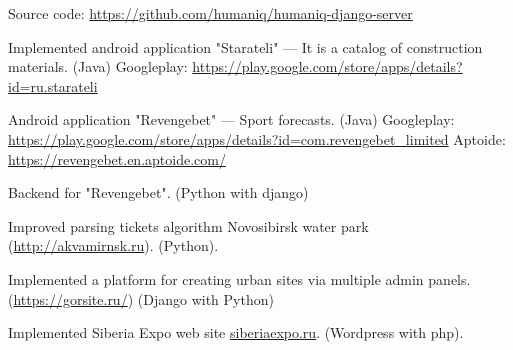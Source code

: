 \begin{cventries}
{\begin{cvitems}
{\begin{flushleft}
            Source code: \url{https://github.com/humaniq/humaniq-django-server}\linebreak
        \end{flushleft}
    }
    \item {
        \begin{flushleft}
            Implemented android application "Starateli" --- It is a catalog of construction materials. (Java)\linebreak
            Googleplay: \url{https://play.google.com/store/apps/details?id=ru.starateli}\linebreak
        \end{flushleft}
    }
\end{cvitems}
}

\cventry
{} %
{} %
{} %
{} %
{
\begin{cvitems}
    \item {
        \begin{flushleft}
            Android application "Revengebet" --- Sport forecasts. (Java)\linebreak
            Googleplay: \url{https://play.google.com/store/apps/details?id=com.revengebet_limited}\linebreak
            Aptoide: \url{https://revengebet.en.aptoide.com/}\linebreak
        \end{flushleft}
    }
    \item {
        \begin{flushleft}
            Backend for "Revengebet". (Python with django)\linebreak
        \end{flushleft}
    }
    \item {
        \begin{flushleft}
            Improved parsing tickets algorithm Novosibirsk water park (\url{http://akvamirnsk.ru}). (Python).\linebreak
        \end{flushleft}
    }
    \item {
        \begin{flushleft}
            Implemented a platform for creating urban sites via multiple admin panels. (\url{https://gorsite.ru/}) (Django with Python)\linebreak
        \end{flushleft}
    }
    \item {
        \begin{flushleft}
            Implemented Siberia Expo web site \url{siberiaexpo.ru}. (Wordpress with php).\linebreak
        \end{flushleft}
    }
\end{cvitems}
}


\end{cventries}
